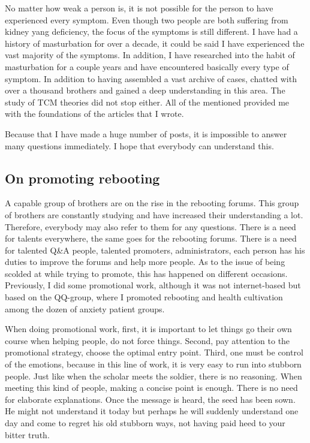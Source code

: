 \documentclass[
]{book}
\begin{document}
No matter how weak a person is, it is not possible for the person to have experienced every symptom. Even though two people are both suffering from kidney yang deficiency, the focus of the symptoms is still different. I have had a history of masturbation for over a decade, it could be said I have experienced the vast majority of the symptoms. In addition, I have researched into the habit of masturbation for a couple years and have encountered basically every type of symptom. In addition to having assembled a vast archive of cases, chatted with over a thousand brothers and gained a deep understanding in this area. The study of TCM theories did not stop either. All of the mentioned provided me with the foundations of the articles that I wrote.

Because that I have made a huge number of posts, it is impossible to answer many questions immediately. I hope that everybody can understand this.

\hypertarget{on-promoting-rebooting}{%
\subsection{On promoting rebooting}\label{on-promoting-rebooting}}

A capable group of brothers are on the rise in the rebooting forums. This group of brothers are constantly studying and have increased their understanding a lot. Therefore, everybody may also refer to them for any questions. There is a need for talents everywhere, the same goes for the rebooting forums. There is a need for talented Q\&A people, talented promoters, administrators, each person has his duties to improve the forums and help more people. As to the issue of being scolded at while trying to promote, this has happened on different occasions. Previously, I did some promotional work, although it was not internet-based but based on the QQ-group, where I promoted rebooting and health cultivation among the dozen of anxiety patient groups.

When doing promotional work, first, it is important to let things go their own course when helping people, do not force things. Second, pay attention to the promotional strategy, choose the optimal entry point. Third, one must be control of the emotions, because in this line of work, it is very easy to run into stubborn people. Just like when the scholar meets the soldier, there is no reasoning. When meeting this kind of people, making a concise point is enough. There is no need for elaborate explanations. Once the message is heard, the seed has been sown. He might not understand it today but perhaps he will suddenly understand one day and come to regret his old stubborn ways, not having paid heed to your bitter truth.
\end{document}
